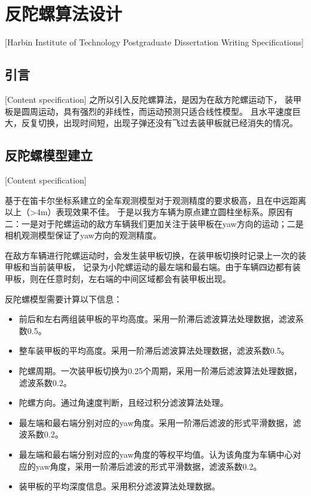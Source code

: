 

\chapter[反陀螺算法设计]{反陀螺算法设计}[Harbin Institute of Technology Postgraduate Dissertation Writing Specifications]

\section{引言}[Content specification]
之所以引入反陀螺算法，是因为在敌方陀螺运动下，
装甲板是圆周运动，具有强烈的非线性，而运动预测只适合线性模型。
且水平速度巨大，反复切换，出现时间短，出现子弹还没有飞过去装甲板就已经消失的情况。


\section{反陀螺模型建立}[Content specification]

基于在笛卡尔坐标系建立的全车观测模型对于观测精度的要求极高，且在中远距离以上（>4m）表现效果不佳。
于是以我方车辆为原点建立圆柱坐标系。原因有二：一是对于陀螺运动的敌方车辆我们更加关注于装甲板在yaw方向的运动；二是相机观测模型保证了yaw方向的观测精度。


在敌方车辆进行陀螺运动时，会发生装甲板切换，在装甲板切换时记录上一次的装甲板和当前装甲板，
记录为小陀螺运动的最左端和最右端。由于车辆四边都有装甲板，则在任意时刻，左右端的中间区域都会有装甲板出现。

反陀螺模型需要计算以下信息：
\begin{itemize}[itemindent=2em]
    \item 前后和左右两组装甲板的平均高度。采用一阶滞后滤波算法处理数据，滤波系数0.5。
    \item 整车装甲板的平均高度。采用一阶滞后滤波算法处理数据，滤波系数0.5。
    \item 陀螺周期。一次装甲板切换为0.25个周期，采用一阶滞后滤波算法处理数据，滤波系数0.2。
    \item 陀螺方向。通过角速度判断，且经过积分滤波算法处理。
    \item 最左端和最右端分别对应的yaw角度。采用一阶滞后滤波的形式平滑数据，滤波系数0.2。
    \item 最左端和最右端分别对应的yaw角度的等权平均值。认为该角度为车辆中心对应的yaw角度，采用一阶滞后滤波的形式平滑数据，滤波系数0.2。
    \item 装甲板的平均深度信息。采用积分滤波算法处理数据。
\end{itemize}


